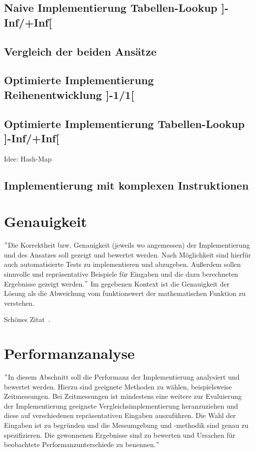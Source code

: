 \documentclass[course=erap]{aspdoc}
\begin{document}
\subsection{Naive Implementierung Tabellen-Lookup ]-Inf/+Inf[}

\subsection{Vergleich der beiden Ansätze}

\subsection{Optimierte Implementierung Reihenentwicklung ]-1/1[}

\subsection{Optimierte Implementierung Tabellen-Lookup ]-Inf/+Inf[}
Idee: Hash-Map

\subsection{Implementierung mit komplexen Instruktionen}

\section{Genauigkeit}
\("\)Die Korrektheit bzw. Genauigkeit (jeweils wo angemessen) der Implementierung und des Ansatzes soll gezeigt und bewertet werden. Nach Möglichkeit sind hierfür auch automatisierte Tests zu implementieren und abzugeben. Außerdem sollen sinnvolle und repräsentative Beispiele für Eingaben und die dazu berechneten Ergebnisse gezeigt werden.\("\)
Im gegebenen Kontext ist die Genauigkeit der Lösung als die Abweichung vom funktionswert der mathematischen Funktion zu verstehen.

Schönes Zitat~\cite{buch}.

\section{Performanzanalyse}
\("\)In diesem Abschnitt soll die Performanz der Implementierung analysiert und bewertet werden. Hierzu sind geeignete Methoden zu wählen, beispielsweise Zeitmessungen. Bei Zeitmessungen ist mindestens eine weitere zur Evaluierung der Implementierung geeignete Vergleichsimplementierung heranzuziehen und diese auf verschiedenen repräsentativen Eingaben auszuführen. Die Wahl der Eingaben ist zu begründen und die Messumgebung und -methodik sind genau zu spezifizieren. Die gewonnenen Ergebnisse sind zu bewerten und Ursachen für beobachtete Performanzunterschiede zu benennen.\("\)
\end{document}
